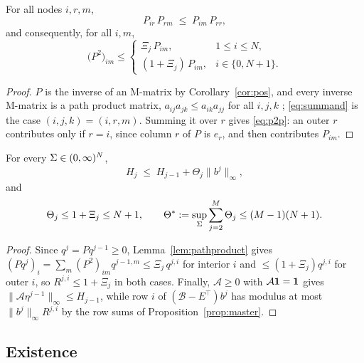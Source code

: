 \begin{lemma}\label{lem:pathproduct}\label{cor:p2p}
For all nodes $i,r,m$,
\begin{equation}\label{eq:summand}
  P_{ir}\,P_{rm}\;\le\;P_{im}\,P_{rr},
\end{equation}
and consequently, for all $i,m$,
\begin{equation}\label{eq:p2p}
  \bigl(P^{2}\bigr)_{im}\le
  \begin{cases}
    \Xi_j\,P_{im}, & 1\le i\le N,\\
    (1+\Xi_j)\,P_{im}, & i\in\{0,N+1\}.
  \end{cases}
\end{equation}
\end{lemma}

\begin{proof}
$P$ is the inverse of an M-matrix by Corollary~\ref{cor:pos}, and every inverse
M-matrix is a path product matrix, $a_{ij}a_{jk}\le a_{ik}a_{jj}$ for all
$i,j,k$ \cite[Theorem~4.5]{JohnsonSmith2011}; \eqref{eq:summand} is the case
$(i,j,k)=(i,r,m)$. Summing it over $r$ gives \eqref{eq:p2p}: an outer $r$
contributes only if $r=i$, since column $r$ of $P$ is $e_r$, and then contributes
$P_{im}$.
\end{proof}

\begin{theorem}\label{thm:wing}
For every $\Sigma\in(0,\infty)^N$,
\begin{equation}\label{eq:step}
  H_j\;\le\;H_{j-1}+\Theta_j\lVert b^j\rVert_\infty ,
\end{equation}
and
\begin{equation}\label{eq:thetabound}
  \Theta_j\le1+\Xi_j\le N+1,
  \qquad
  \Theta^{*}:=\sup_{\Sigma}\sum_{j=2}^{M}\Theta_j\le(M-1)(N+1).
\end{equation}
\end{theorem}

\begin{proof}
Since $q^j=Pq^{j-1}\ge0$, Lemma~\ref{lem:pathproduct} gives
$(Pq^j)_i=\sum_m(P^2)_{im}q^{j-1,m}\le\Xi_j\,q^{j,i}$ for interior $i$ and
$\le(1+\Xi_j)q^{j,i}$ for outer $i$, so $R^{j,i}\le1+\Xi_j$ in both cases. Finally,
$\mathcal A\ge0$ with $\mathcal A\mathbf 1=\mathbf 1$ gives
$\lVert\mathcal A\eta^{j-1}\rVert_\infty\le H_{j-1}$, while row $i$ of
$(\mathcal B-E^{\!\top})b^{j}$ has modulus at most $\lVert b^j\rVert_\infty R^{j,i}$
by the row sums of Proposition~\ref{prop:master}.
\end{proof}

\subsection{Existence}\label{sec:existence}

